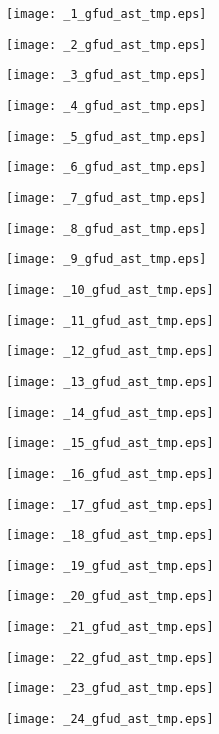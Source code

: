 \documentclass{article}
\begin{document}
\texttt{[image: \_1\_gfud\_ast\_tmp.eps]}

\texttt{[image: \_2\_gfud\_ast\_tmp.eps]}

\texttt{[image: \_3\_gfud\_ast\_tmp.eps]}

\texttt{[image: \_4\_gfud\_ast\_tmp.eps]}

\texttt{[image: \_5\_gfud\_ast\_tmp.eps]}

\texttt{[image: \_6\_gfud\_ast\_tmp.eps]}

\texttt{[image: \_7\_gfud\_ast\_tmp.eps]}

\texttt{[image: \_8\_gfud\_ast\_tmp.eps]}

\texttt{[image: \_9\_gfud\_ast\_tmp.eps]}

\texttt{[image: \_10\_gfud\_ast\_tmp.eps]}

\texttt{[image: \_11\_gfud\_ast\_tmp.eps]}

\texttt{[image: \_12\_gfud\_ast\_tmp.eps]}

\texttt{[image: \_13\_gfud\_ast\_tmp.eps]}

\texttt{[image: \_14\_gfud\_ast\_tmp.eps]}

\texttt{[image: \_15\_gfud\_ast\_tmp.eps]}

\texttt{[image: \_16\_gfud\_ast\_tmp.eps]}

\texttt{[image: \_17\_gfud\_ast\_tmp.eps]}

\texttt{[image: \_18\_gfud\_ast\_tmp.eps]}

\texttt{[image: \_19\_gfud\_ast\_tmp.eps]}

\texttt{[image: \_20\_gfud\_ast\_tmp.eps]}

\texttt{[image: \_21\_gfud\_ast\_tmp.eps]}

\texttt{[image: \_22\_gfud\_ast\_tmp.eps]}

\texttt{[image: \_23\_gfud\_ast\_tmp.eps]}

\texttt{[image: \_24\_gfud\_ast\_tmp.eps]}
\end{document}

